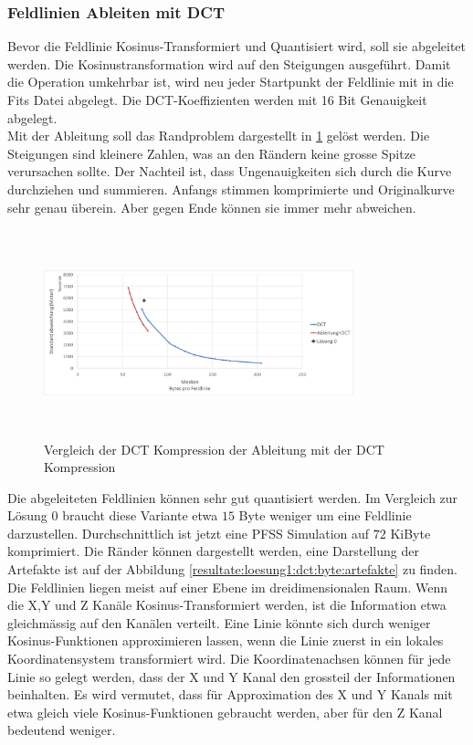 \subsubsection{Feldlinien Ableiten mit DCT}\label{resultate:dct:ableitung_dct}
Bevor die Feldlinie Kosinus-Transformiert und Quantisiert wird, soll sie abgeleitet werden. Die Kosinustransformation wird auf den Steigungen ausgeführt. Damit die Operation umkehrbar ist, wird neu jeder Startpunkt der Feldlinie mit in die Fits Datei abgelegt. Die DCT-Koeffizienten werden mit 16 Bit Genauigkeit abgelegt.\\
Mit der Ableitung soll das Randproblem dargestellt in \ref{resultate:loesung1:dct:artefakte} gelöst werden. Die Steigungen sind kleinere Zahlen, was an den Rändern keine grosse Spitze verursachen sollte. Der Nachteil ist, dass Ungenauigkeiten sich durch die Kurve durchziehen und summieren. Anfangs stimmen komprimierte und Originalkurve sehr genau überein. Aber gegen Ende können sie immer mehr abweichen.\\
\begin{figure}[!htbp]
	\center
	\includegraphics[width=0.8\textwidth,height=6cm,keepaspectratio]{./pictures/resultate/loesung1/loesung1-1/loesung1_1.png}
	\caption{Vergleich der DCT Kompression der Ableitung mit der DCT Kompression}
	\label{resultate:loesung1:dct:artefakte}
\end{figure}
Die abgeleiteten Feldlinien können sehr gut quantisiert werden. Im Vergleich zur Lösung 0 braucht diese Variante etwa $15$ Byte weniger um eine Feldlinie darzustellen. Durchschnittlich ist jetzt eine PFSS Simulation auf $72$ KiByte komprimiert. Die Ränder können dargestellt werden, eine Darstellung der Artefakte ist auf der Abbildung \ref{resultate:loesung1:dct:byte:artefakte} zu finden.\\
Die Feldlinien liegen meist auf einer Ebene im dreidimensionalen Raum. Wenn die X,Y und Z Kanäle Kosinus-Transformiert werden, ist die Information etwa gleichmässig auf den Kanälen verteilt. Eine Linie könnte sich durch weniger Kosinus-Funktionen approximieren lassen, wenn die Linie zuerst in ein lokales Koordinatensystem transformiert wird. Die Koordinatenachsen können für jede Linie so gelegt werden, dass der X und Y Kanal den grossteil der Informationen beinhalten. Es wird vermutet, dass für Approximation des X und Y Kanals mit etwa gleich viele Kosinus-Funktionen gebraucht werden, aber für den Z Kanal bedeutend weniger.

